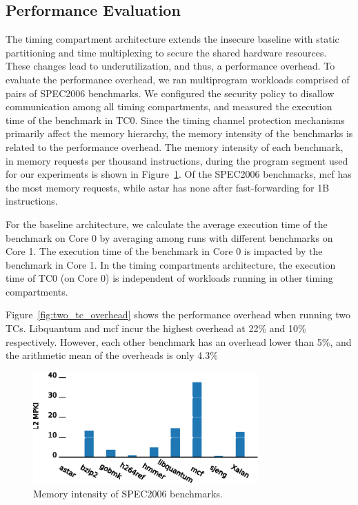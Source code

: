 \subsection{Performance Evaluation}

The timing compartment architecture extends the insecure baseline with
static partitioning and time multiplexing to secure the shared hardware 
resources. These changes lead to underutilization, and thus, a performance
overhead. To evaluate the performance overhead, we ran multiprogram workloads 
comprised of pairs of SPEC2006 benchmarks.
We configured the security policy to disallow communication among all timing 
compartments, and measured the execution time of the benchmark
in TC0. Since the timing channel protection mechanisms primarily affect the 
memory hierarchy, the memory intensity of the benchmarks is related to the 
performance overhead.
The memory intensity of each benchmark, in memory requests per thousand 
instructions, during the program segment used for our experiments is shown in
Figure~\ref{fig:memstudy}. Of the SPEC2006 benchmarks, mcf has the most memory 
requests, while astar has none after fast-forwarding for 1B instructions.

For the baseline architecture, we calculate the average execution time of the 
benchmark on Core 0 by averaging among runs with different benchmarks on Core 
1.  The execution time of the benchmark in Core 0 is impacted by the benchmark 
in Core 1. In the timing compartments architecture, the execution time of TC0 
(on Core 0) is independent of workloads running in other timing compartments.

Figure~\ref{fig:two_tc_overhead} shows the performance overhead when running 
two TCs. Libquantum and mcf incur the highest overhead at 22\% and 10\% 
respectively. However, each other benchmark has an overhead lower than 5\%, and 
the arithmetic mean of the overheads is only 4.3\%

\begin{figure}
    \begin{center}
        \includegraphics[width=3.4in]{figs/MPKI.eps}
        \caption{Memory intensity of SPEC2006 benchmarks.}
        \label{fig:memstudy}
    \end{center}
\end{figure}

